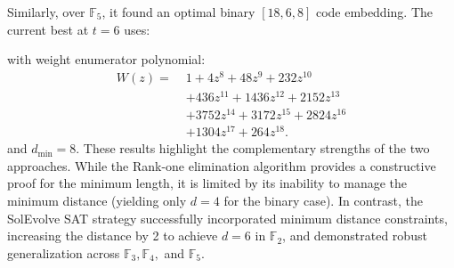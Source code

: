Similarly, over $\mathbb{F}_5$, it found an optimal binary $[18,6,8]$ code embedding. The current best at $t=6$ uses:
\begin{center}
\end{center}
with weight enumerator polynomial:
\begin{align*}
W(z) =\; & 1 + 4z^8 + 48z^9 + 232z^{10} \\
&+ 436z^{11} + 1436z^{12} + 2152z^{13} \\
&+ 3752z^{14} + 3172z^{15} + 2824z^{16} \\
&+ 1304z^{17} + 264z^{18}.
\end{align*}
and $d_{\min}=8$. These results highlight the complementary strengths of the two approaches. While the Rank-one elimination algorithm provides a constructive proof for the minimum length, it is limited by its inability to manage the minimum distance (yielding only $d=4$ for the binary case). In contrast, the SolEvolve SAT strategy successfully incorporated minimum distance constraints, increasing the distance by 2 to achieve $d=6$ in $\mathbb{F}_2$, and demonstrated robust generalization across $\mathbb{F}_3, \mathbb{F}_4,$ and $\mathbb{F}_5$. 

